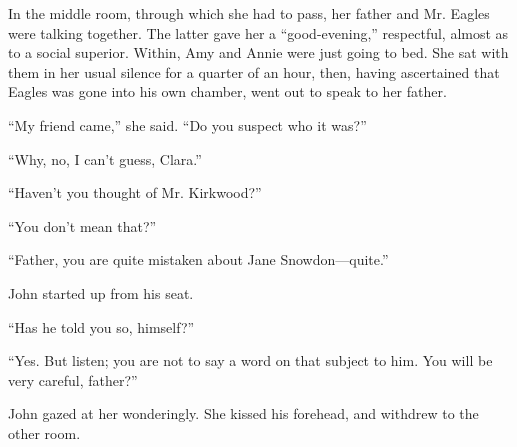 In the middle room, through which she had to pass, her father and Mr.
Eagles were talking together. The latter gave her a ``good-evening,''
respectful, almost as to a social {}superior. Within, Amy and Annie were
just going to bed. She sat with them in her usual silence for a quarter
of an hour, then, having ascertained that Eagles was gone into his own
chamber, went out to speak to her father.

``My friend came,'' she said. ``Do you suspect who it was?''

``Why, no, I can't guess, Clara.''

``Haven't you thought of Mr. Kirkwood?''

``You don't mean that?''

``Father, you are quite mistaken about Jane Snowdon---quite.''

John started up from his seat.

``Has he told you so, himself?''

``Yes. But listen; you are not to say a word on that subject to him. You
will be very careful, father?''

John gazed at her wonderingly. She kissed his forehead, and withdrew to
the other room.

